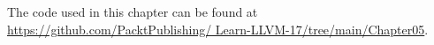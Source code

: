 The code used in this chapter can be found at \url{https://github.com/PacktPublishing/ Learn-LLVM-17/tree/main/Chapter05}.